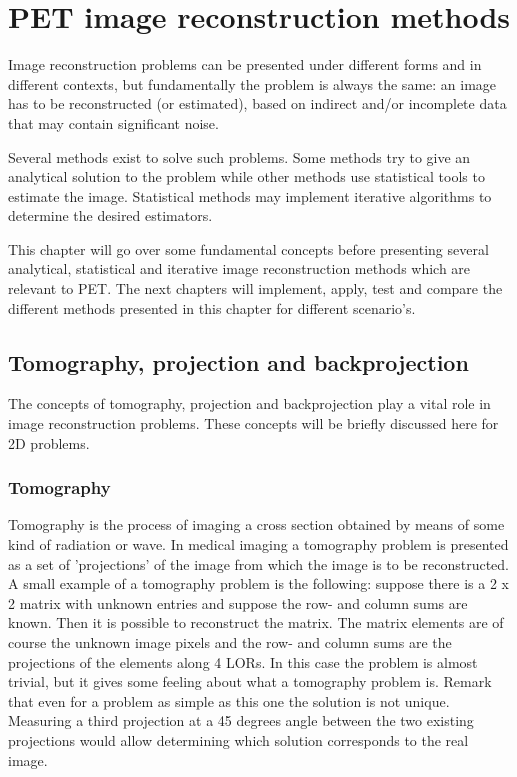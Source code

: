 \documentclass[report,12pt]{report}
\newcounter{theorem}
\newcounter{chpt}
\begin{document}
\chapter{PET image reconstruction methods} \setcounter{theorem}{1}
Image reconstruction problems can be presented under different forms and in different contexts, but fundamentally the problem is always the same: an image has to be reconstructed (or estimated), based on indirect and/or incomplete data that may contain significant noise.  	

Several methods exist to solve such problems. Some methods try to give an analytical solution to the problem while other methods use statistical tools to estimate the image.  Statistical methods may implement iterative algorithms to determine the desired estimators.

This chapter will go over some fundamental concepts before presenting several analytical, statistical and iterative image reconstruction methods which are relevant to PET. The next chapters will implement, apply, test and compare the different methods presented in this chapter for different scenario's.




\section{Tomography, projection and backprojection}
The concepts of tomography, projection and backprojection \cite{leastsquare} play a vital role in image reconstruction problems. These concepts will be briefly discussed here for 2D problems.




\subsection{Tomography}
Tomography is the process of imaging a cross section obtained by means of some kind of radiation or wave. In medical imaging a tomography problem is presented as a set of 'projections' of the image from which the image is to be reconstructed.\\

A small example of a tomography problem is the following: suppose there is a 2 x 2 matrix with unknown entries and suppose the row- and column sums are known. Then it is possible to reconstruct the matrix. The matrix elements are of course the unknown image pixels and the row- and column sums are the projections of the elements along 4 LORs. In this case the problem is almost trivial, but it gives some feeling about what a tomography problem is. Remark that even for a problem as simple as this one the solution is not unique. Measuring a third projection at a 45 degrees angle between the two existing projections would allow determining which solution corresponds to the real image. 
\end{document}
